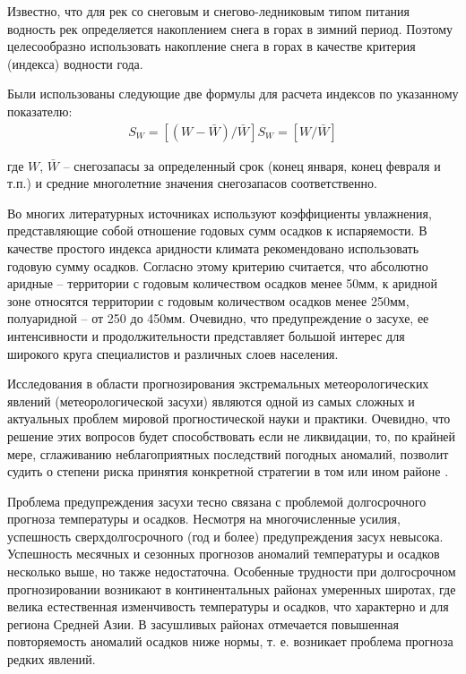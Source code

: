 Известно, что для рек со снеговым и снегово-ледниковым типом питания водность рек определяется накоплением снега в горах в зимний период. Поэтому целесообразно использовать накопление снега в горах в качестве критерия (индекса) водности года.

Были использованы следующие две формулы для расчета индексов по указанному показателю:
\begin{equation}\label{eq_1.2}
\begin{aligned}
S_W = [(W-\bar{W})/\bar{W}]
S_W = [W/\bar{W}]
\end{aligned}
\end{equation}

где $W$, $\bar{W}$ -- снегозапасы за определенный срок (конец января, конец февраля и т.п.) и средние многолетние значения снегозапасов соответственно.

Во многих литературных источниках используют коэффициенты увлажнения, представляющие собой отношение годовых сумм осадков к испаряемости.
В качестве простого индекса аридности климата рекомендовано использовать годовую сумму осадков. Согласно этому критерию считается, что абсолютно аридные – территории с годовым количеством осадков менее 50мм, к аридной зоне относятся территории с годовым количеством осадков менее 250мм, полуаридной – от 250 до 450мм.
Очевидно, что предупреждение о засухе, ее интенсивности и продолжительности представляет большой интерес для широкого круга специалистов и различных слоев населения.

Исследования в области прогнозирования экстремальных метеорологических явлений (метеорологической засухи) являются одной из самых сложных и актуальных проблем мировой прогностической науки и практики. Очевидно, что решение этих вопросов будет способствовать если не ликвидации, то, по крайней мере, сглаживанию неблагоприятных последствий погодных аномалий, позволит судить о степени риска принятия конкретной стратегии в том или ином районе \cite{Agaltseva2004}.

Проблема предупреждения засухи тесно связана с проблемой долгосрочного прогноза температуры и осадков. Несмотря на многочисленные усилия, успешность сверхдолгосрочного (год и более) предупреждения засух невысока. Успешность месячных и сезонных прогнозов аномалий температуры и осадков несколько выше, но также недостаточна. Особенные трудности при долгосрочном прогнозировании возникают в континентальных районах умеренных широтах, где велика естественная изменчивость температуры и осадков, что характерно и для региона Средней Азии. В засушливых районах отмечается повышенная повторяемость аномалий осадков ниже нормы, т. е. возникает проблема прогноза редких явлений.

